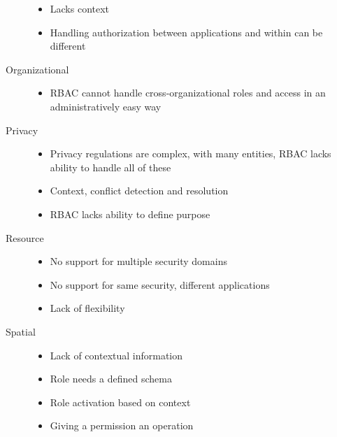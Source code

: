 \documentclass[letterpaper,10pt,english]{sphinxmanual}
\begin{document}
\begin{description}
\begin{itemize}
\item {} 
Lacks context

\item {} 
Handling authorization between applications and within can be different

\end{itemize}

\item[{Organizational}] \leavevmode\begin{itemize}
\item {} 
RBAC cannot handle cross-organizational roles and access in an administratively easy way

\end{itemize}

\item[{Privacy}] \leavevmode\begin{itemize}
\item {} 
Privacy regulations are complex, with many entities, RBAC lacks ability to handle all of these

\item {} 
Context, conflict detection and resolution

\item {} 
RBAC lacks ability to define purpose

\end{itemize}

\item[{Resource}] \leavevmode\begin{itemize}
\item {} 
No support for multiple security domains

\item {} 
No support for same security, different applications

\item {} 
Lack of flexibility

\end{itemize}

\item[{Spatial}] \leavevmode\begin{itemize}
\item {} 
Lack of contextual information

\item {} 
Role needs a defined schema

\item {} 
Role activation based on context

\item {} 
Giving a permission an operation


\end{itemize}
\end{description}
\end{document}
